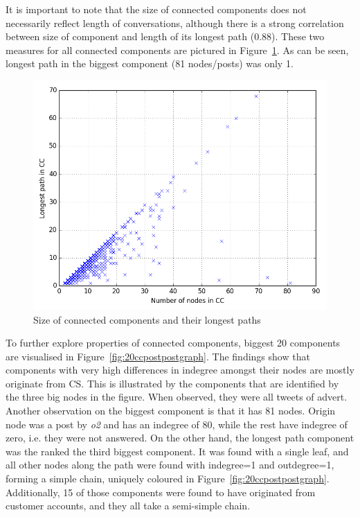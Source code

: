 \documentclass[sigconf]{acmart}
\begin{document}

It is important to note that the size of connected components does not
necessarily reflect length of conversations, although there is a
strong correlation between size of component and length of its longest
path (0.88). These two measures for all connected components are
pictured in Figure~\ref{fig:ccsizepaths}. As can be seen, longest path
in the biggest component (81 nodes/posts) was only 1.

\begin{figure}[htb]
\centering
\includegraphics[width=\columnwidth]{images/ccsizepaths.png}
\caption{Size of connected components and their longest paths}
\label{fig:ccsizepaths}
\end{figure}

To further explore properties of connected components, biggest 20
components are visualised in Figure~\ref{fig:20ccpostpostgraph}. The
findings show that components with very high differences in indegree
amongst their nodes are mostly originate from CS. This is illustrated
by the components that are identified by the three big nodes in the
figure. When observed, they were all tweets of advert. Another
observation on the biggest component is that it has 81 nodes. Origin
node was a post by {\emph{o2}} and has an indegree of 80, while the
rest have indegree of zero, i.e. they were not answered. On the other
hand, the longest path component was the ranked the third biggest
component. It was found with a single leaf, and all other nodes along
the path were found with indegree=1 and outdegree=1, forming a simple
chain, uniquely coloured in
Figure~\ref{fig:20ccpostpostgraph}. Additionally, 15 of those
components were found to have originated from customer accounts, and
they all take a semi-simple chain.
\end{document}
